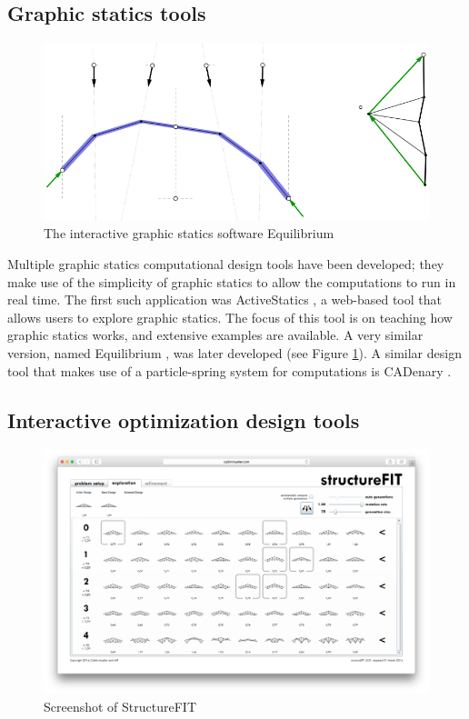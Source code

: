 \subsection{Graphic statics tools}

\begin{figure}
  \includegraphics[width=330pt]{graphics/equilibrium.png}
  \caption{The interactive graphic statics software Equilibrium \cite{Block}}
  \label{fig:equilibrium}
\end{figure}

Multiple graphic statics computational design tools have been developed; they make use of the simplicity of graphic statics to allow the computations to run in real time. The first such application was ActiveStatics \cite{ActiveStatics}, a web-based tool that allows users to explore graphic statics. The focus of this tool is on teaching how graphic statics works, and extensive examples are available. A very similar version, named Equilibrium \cite{Block}, was later developed (see Figure \ref{fig:equilibrium}). A similar design tool that makes use of a particle-spring system for computations is CADenary \cite{CADenary}.


\subsection{Interactive optimization design tools}

\begin{figure}
  \includegraphics[width=350pt]{graphics/structurefit.png}
  \caption{Screenshot of StructureFIT}
  \label{fig:structurefit}
\end{figure}

